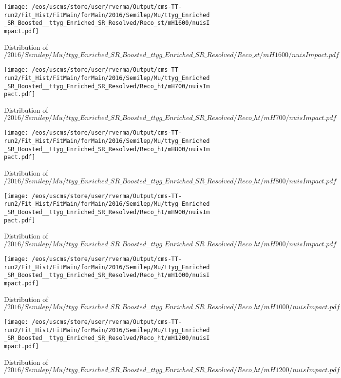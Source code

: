 \begin{figure}
\centering
\texttt{[image: /eos/uscms/store/user/rverma/Output/cms-TT-run2/Fit\_Hist/FitMain/forMain/2016/Semilep/Mu/ttyg\_Enriched\_SR\_Boosted\_\_ttyg\_Enriched\_SR\_Resolved/Reco\_st/mH1600/nuisImpact.pdf]}
\caption{Distribution of $/2016/Semilep/Mu/ttyg\_Enriched\_SR\_Boosted\_\_ttyg\_Enriched\_SR\_Resolved/Reco\_st/mH1600/nuisImpact.pdf$}
\end{figure}

\begin{figure}
\centering
\texttt{[image: /eos/uscms/store/user/rverma/Output/cms-TT-run2/Fit\_Hist/FitMain/forMain/2016/Semilep/Mu/ttyg\_Enriched\_SR\_Boosted\_\_ttyg\_Enriched\_SR\_Resolved/Reco\_ht/mH700/nuisImpact.pdf]}
\caption{Distribution of $/2016/Semilep/Mu/ttyg\_Enriched\_SR\_Boosted\_\_ttyg\_Enriched\_SR\_Resolved/Reco\_ht/mH700/nuisImpact.pdf$}
\end{figure}

\begin{figure}
\centering
\texttt{[image: /eos/uscms/store/user/rverma/Output/cms-TT-run2/Fit\_Hist/FitMain/forMain/2016/Semilep/Mu/ttyg\_Enriched\_SR\_Boosted\_\_ttyg\_Enriched\_SR\_Resolved/Reco\_ht/mH800/nuisImpact.pdf]}
\caption{Distribution of $/2016/Semilep/Mu/ttyg\_Enriched\_SR\_Boosted\_\_ttyg\_Enriched\_SR\_Resolved/Reco\_ht/mH800/nuisImpact.pdf$}
\end{figure}

\begin{figure}
\centering
\texttt{[image: /eos/uscms/store/user/rverma/Output/cms-TT-run2/Fit\_Hist/FitMain/forMain/2016/Semilep/Mu/ttyg\_Enriched\_SR\_Boosted\_\_ttyg\_Enriched\_SR\_Resolved/Reco\_ht/mH900/nuisImpact.pdf]}
\caption{Distribution of $/2016/Semilep/Mu/ttyg\_Enriched\_SR\_Boosted\_\_ttyg\_Enriched\_SR\_Resolved/Reco\_ht/mH900/nuisImpact.pdf$}
\end{figure}

\begin{figure}
\centering
\texttt{[image: /eos/uscms/store/user/rverma/Output/cms-TT-run2/Fit\_Hist/FitMain/forMain/2016/Semilep/Mu/ttyg\_Enriched\_SR\_Boosted\_\_ttyg\_Enriched\_SR\_Resolved/Reco\_ht/mH1000/nuisImpact.pdf]}
\caption{Distribution of $/2016/Semilep/Mu/ttyg\_Enriched\_SR\_Boosted\_\_ttyg\_Enriched\_SR\_Resolved/Reco\_ht/mH1000/nuisImpact.pdf$}
\end{figure}

\begin{figure}
\centering
\texttt{[image: /eos/uscms/store/user/rverma/Output/cms-TT-run2/Fit\_Hist/FitMain/forMain/2016/Semilep/Mu/ttyg\_Enriched\_SR\_Boosted\_\_ttyg\_Enriched\_SR\_Resolved/Reco\_ht/mH1200/nuisImpact.pdf]}
\caption{Distribution of $/2016/Semilep/Mu/ttyg\_Enriched\_SR\_Boosted\_\_ttyg\_Enriched\_SR\_Resolved/Reco\_ht/mH1200/nuisImpact.pdf$}
\end{figure}


